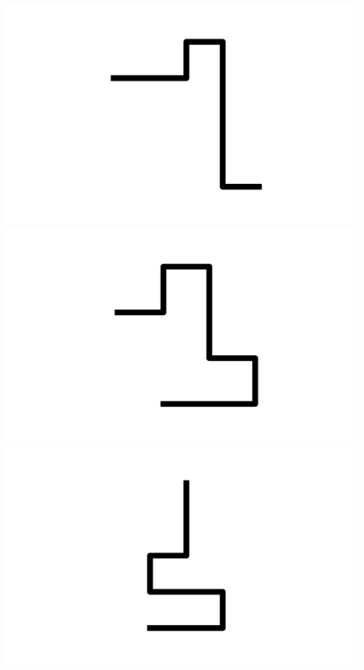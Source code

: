\documentclass[]{report}
\begin{document}
\includegraphics[scale=.1]{pictures/21/state_cluster_shapes_79.pdf} 
\includegraphics[scale=.1]{pictures/21/state_cluster_shapes_80.pdf} 
\includegraphics[scale=.1]{pictures/21/state_cluster_shapes_81.pdf} 
\end{document}
